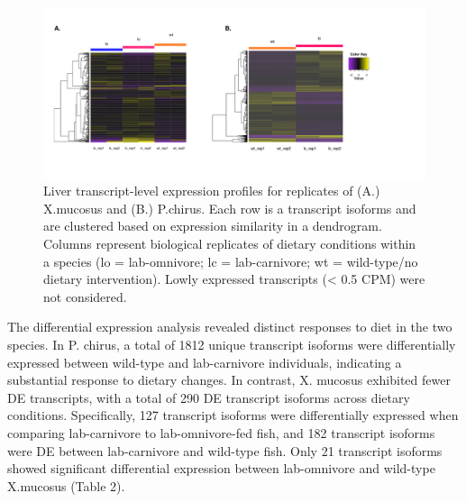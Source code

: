 \documentclass[12pt,]{article}
\begin{document}
\begin{figure}[htbp]
\centering
\includegraphics[width=\textwidth]{output/figures/combined-xm-pc-expression-heatmaps-final-project.png}
\caption{Liver transcript-level expression profiles for replicates of (A.) X.mucosus and (B.) P.chirus. Each row is a transcript isoforms and are clustered based on expression similarity in a dendrogram. Columns represent biological replicates of dietary conditions within a species (lo = lab-omnivore; lc = lab-carnivore; wt = wild-type/no dietary intervention). Lowly expressed transcripts (< 0.5 CPM) were not considered.}
\end{figure}

The differential expression analysis revealed distinct responses to diet
in the two species. In P. chirus, a total of 1812 unique transcript
isoforms were differentially expressed between wild-type and
lab-carnivore individuals, indicating a substantial response to dietary
changes. In contrast, X. mucosus exhibited fewer DE transcripts, with a
total of 290 DE transcript isoforms across dietary conditions.
Specifically, 127 transcript isoforms were differentially expressed when
comparing lab-carnivore to lab-omnivore-fed fish, and 182 transcript
isoforms were DE between lab-carnivore and wild-type fish. Only 21
transcript isoforms showed significant differential expression between
lab-omnivore and wild-type X.mucosus (Table 2).
\end{document}
